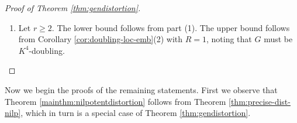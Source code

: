 \documentclass[11pt,reqno]{amsart}
\newcommand{\1}{\mathbf 1}
\begin{document}
\begin{proof}[Proof of Theorem \ref{thm:gendistortion}]
\begin{enumerate}
We therefore have
\begin{align*}
c_1\mu\left(B_{r/4}\right)^{1/q}\rho^{1/q}\left(\log\left(r/4\right)\right)^{1/q}&\le \left(\int_1^{r^\rho/4^\rho} \int_{B_{r/4}}\left(\frac{\left\|F\left(h\exp\left(tv\right)\right)-F\left(h\right)\right\|_X}{t^{1/\rho}}\right)^qd\mu\left(h\right)\frac{dt}{t}\right)^{1/q}\\
&\stackrel{\mathclap{\eqref{eq:continuous main}}}{\lesssim} \left(\rho+\frac{1}{\rho-1}\right) K_q\left(X\right) \left\|F\right\|_{\dot{Ch}_0^{1,q}\left(G;X\right)}\lesssim_G \sqrt{k}\left(\rho+\frac{1}{\rho-1}\right) K_q\left(X\right)\mu\left(B_r\right)^{1/q}D.
\end{align*}
This gives the stated estimate.

\item
Let $r\ge 2$. The lower bound follows from part (1). The upper bound follows from Corollary \ref{cor:doubling-loc-emb}(2) with $R=1$, noting that $G$ must be $K^4$-doubling.



\end{enumerate}
\end{proof}



Now we begin the proofs of the remaining statements. First we observe that Theorem \ref{mainthm:nilpotentdistortion} follows from Theorem \ref{thm:precise-dist-nilp}, which in turn is a special case of Theorem \ref{thm:gendistortion}.
\end{document}
